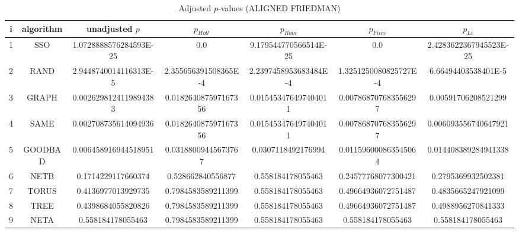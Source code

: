 \documentclass[a4paper,10pt]{article}
\begin{document}
\begin{landscape}
\begin{table}[!htp]
\centering\scriptsize
\caption{Adjusted $p$-values (ALIGNED FRIEDMAN)}
\begin{tabular}{ccccccc}
i&algorithm&unadjusted $p$&$p_{Holl}$&$p_{Rom}$&$p_{Finn}$&$p_{Li}$\\
\hline
1& SSO&1.0728888576284593E-25&0.0&9.179544770566514E-25&0.0&2.4283622367945523E-25\\
2& RAND&2.9448740014116313E-5&2.355656391508365E-4&2.2397458953683484E-4&1.3251250080825727E-4&6.66494403538401E-5\\
3& GRAPH&0.0026298124119894383&0.018264087597167356&0.015453476497404011&0.007868707683556297&0.00591706208521299\\
4& SAME&0.002708735614094936&0.018264087597167356&0.015453476497404011&0.007868707683556297&0.006093556740647921\\
5& GOODBAD&0.006458916944518951&0.03188009445673767&0.0307118492176994&0.011596000863545064&0.014408389284941338\\
6& NETB&0.1714229117660374&0.528662840556877&0.558184178055463&0.24577768077300421&0.2795369932502381\\
7& TORUS&0.4136977013929735&0.7984583589211399&0.558184178055463&0.49664936072751487&0.4835665247921099\\
8& TREE&0.4398684055820826&0.7984583589211399&0.558184178055463&0.49664936072751487&0.4988956270841333\\
9& NETA&0.558184178055463&0.7984583589211399&0.558184178055463&0.558184178055463&0.558184178055463\\
\hline
\end{tabular}
\end{table}


\newpage


\end{landscape}
\end{document}
